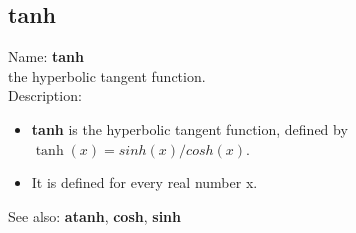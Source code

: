 \subsection{ tanh }
\noindent Name: \textbf{tanh}\\
the hyperbolic tangent function.\\

\noindent Description: \begin{itemize}

\item \textbf{tanh} is the hyperbolic tangent function, defined by $\tanh(x) = sinh(x)/cosh(x)$.

\item It is defined for every real number x.
\end{itemize}
See also: \textbf{atanh}, \textbf{cosh}, \textbf{sinh}
